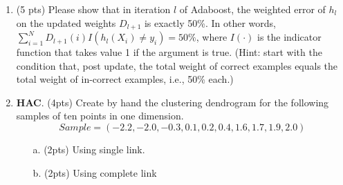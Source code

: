\documentclass{article}
\begin{document}
\begin{enumerate}
{Observe that all of the leaf nodes are either pure or empty. This means that $H(Y|A,B,C) = 0$.
}

\item (5 pts) Please show that in iteration $l$ of Adaboost, the weighted error of $h_l$ on the updated weights $D_{l+1}$ is exactly 50\%. In other words, $\sum_{i=1}^N D_{l+1}(i) I(h_l(X_i)\neq y_i) = 50\%$, where $I(\cdot)$ is the indicator function that takes value 1 if the argument is true. (Hint: start with the condition that, post update, the total weight of correct examples equals the total weight of in-correct examples, i.e., 50\% each.)


\item {\bf HAC}. (4pts) Create by hand the clustering dendrogram for the following samples of ten points in one dimension.
\[Sample=( - 2.2, -2.0, -0.3, 0.1, 0.2, 0.4, 1.6, 1.7, 1.9, 2.0)\]
\begin{itemize}
\item[a.] (2pts) Using single link.\\

\item[b.] (2pts) Using complete link \\


\end{itemize}
\end{enumerate}
\end{document}
